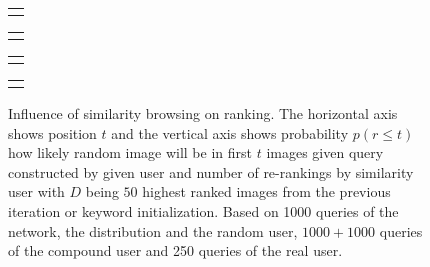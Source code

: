 \begin{figure}[ht]
	\centering
	\begin{tabular}{@{}c@{}}
		\subfloat{
			
		}
	\end{tabular}
	\begin{tabular}{@{}c@{}}
		\subfloat{
			
		}
	\end{tabular}
	\begin{tabular}{@{}c@{}}
		\subfloat{
			
		}
	\end{tabular}
	\begin{tabular}{@{}c@{}}
		\subfloat{
			
		}
	\end{tabular}
	
	
	\caption[Influence of similarity browsing on ranking]{Influence of similarity browsing on ranking. The horizontal axis shows position $t$ and the vertical axis shows probability $p(r\leq t)$ how likely random image will be in first $t$ images given query constructed by given user and number of re-rankings by similarity user with $D$ being $50$ highest ranked images from the previous iteration or keyword initialization. Based on 1000 queries of the network, the distribution and the random user, $1000+1000$ queries of the compound user and 250 queries of the real user.}
	\label{fig:simulation_rerank}
\end{figure}

